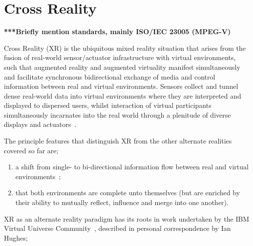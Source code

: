 
%


\section{Cross Reality}
\label{sec_crossreality}

\textbf{***Briefly mention standards, mainly ISO/IEC 23005 (MPEG-V)}

\newcommand{\SLfootnote}{\footnote{Second Life.}}

Cross Reality (XR) is the ubiquitous mixed reality situation that arises from the fusion of real-world sensor/actuator infrastructure with virtual environments, such that augmented reality and augmented virtuality manifest simultaneously and facilitate synchronous bidirectional exchange of media and control information between real and virtual environments. Sensors collect and tunnel dense real-world data into virtual environments where they are interpreted and displayed to dispersed users, whilst interaction of virtual participants simultaneously incarnates into the real world through a plenitude of diverse displays and actuators~\cite{Paradiso2009}.

The principle features that distinguish XR from the other alternate realities covered so far are;
\begin{enumerate}
	\item a shift from single- to bi-directional information flow between real and virtual environments~\cite{kim:practical};
	\item that both environments are complete unto themselves (but are enriched by their ability to mutually reflect, influence and merge into one another).~\cite{lifton:merging}
\end{enumerate}


XR as an alternate reality paradigm has its roots in work undertaken by the IBM Virtual Universe Community~\cite{Hughes2006, Hughes2006a,Hughes2006b}, described in personal correspondence by Ian Hughes;

